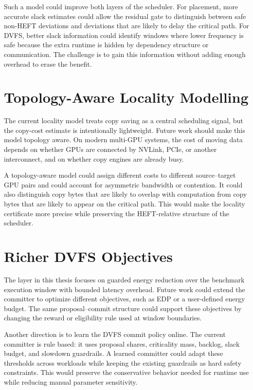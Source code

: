 Such a model could improve both layers of the scheduler. For placement, more
accurate slack estimates could allow the residual gate to distinguish between
safe non-HEFT deviations and deviations that are likely to delay the critical
path. For DVFS, better slack information could identify windows where lower
frequency is safe because the extra runtime is hidden by dependency structure
or communication. The challenge is to gain this information without adding
enough overhead to erase the benefit.

\section{Topology-Aware Locality Modelling}
\label{sec:future-topology-locality}

The current locality model treats copy saving as a central scheduling signal,
but the copy-cost estimate is intentionally lightweight. Future work should
make this model topology aware. On modern multi-GPU systems, the cost of
moving data depends on whether GPUs are connected by NVLink, PCIe, or another
interconnect, and on whether copy engines are already busy.

A topology-aware model could assign different costs to different source--target
GPU pairs and could account for asymmetric bandwidth or contention. It could
also distinguish copy bytes that are likely to overlap with computation from
copy bytes that are likely to appear on the critical path. This would make the
locality certificate more precise while preserving the HEFT-relative structure
of the scheduler.

\section{Richer DVFS Objectives}
\label{sec:future-dvfs-objectives}

The \WinDVFS{} layer in this thesis focuses on guarded energy reduction over the
benchmark execution window with bounded latency overhead. Future work could
extend the committer to optimize different objectives, such as EDP or a
user-defined energy budget. The same proposal--commit structure could support
these objectives by changing the reward or eligibility rule used at window
boundaries.

Another direction is to learn the DVFS commit policy online. The current
committer is rule based: it uses proposal shares, criticality mass, backlog,
slack budget, and slowdown guardrails. A learned committer could adapt these
thresholds across workloads while keeping the existing guardrails as hard
safety constraints. This would preserve the conservative behavior needed for
runtime use while reducing manual parameter sensitivity.

